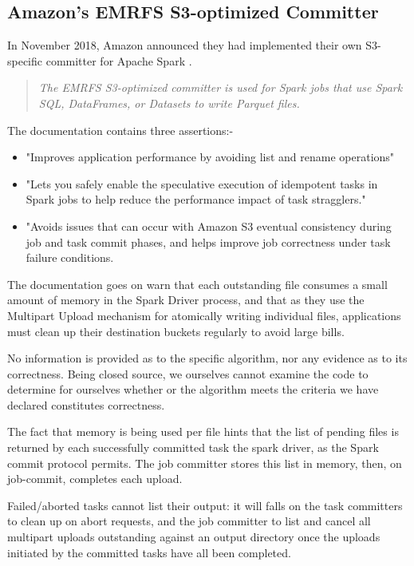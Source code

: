 \documentclass[conference]{IEEEtran}
\begin{document}
\subsection{Amazon's EMRFS S3-optimized Committer}
\label{subsec:emrfs-committer}

In November 2018, Amazon announced they had implemented their own S3-specific
committer for Apache Spark \cite{AWS-EMR-committer}.

\begin{quote}
\emph{
The EMRFS S3-optimized committer is used for Spark jobs that use Spark SQL,
DataFrames, or Datasets to write Parquet files.}
\end{quote}

The documentation contains three assertions:-

\begin{itemize}
  \item "Improves application performance by avoiding list and rename operations"
  \item "Lets you safely enable the speculative execution of idempotent tasks in Spark jobs to help reduce the performance impact of task stragglers."
  \item "Avoids issues that can occur with Amazon S3 eventual consistency during job and task commit phases, and helps improve job correctness under task failure conditions.
\end{itemize}

The documentation goes on warn that each outstanding 
file consumes a small amount of memory in the Spark Driver process,
and that as they use the Multipart Upload mechanism for
atomically writing individual files, applications must clean up their
destination buckets regularly to avoid large bills.

No information is provided as to the specific algorithm, nor any evidence
as to its correctness.
Being closed source, we ourselves cannot examine
the code to determine for ourselves whether or the algorithm meets the
criteria we have declared constitutes correctness.

The fact that memory is being used per file hints that the list
of pending files is returned by each successfully committed task
the spark driver, as the Spark commit protocol permits.
The job committer stores this list in memory, then, on job-commit, 
completes each upload.

Failed/aborted tasks cannot list their output: it will falls on the
task committers to clean up on abort requests, and the job committer to
list and cancel all multipart uploads outstanding against an output directory
once the uploads initiated by the committed tasks have all been completed.
\end{document}
